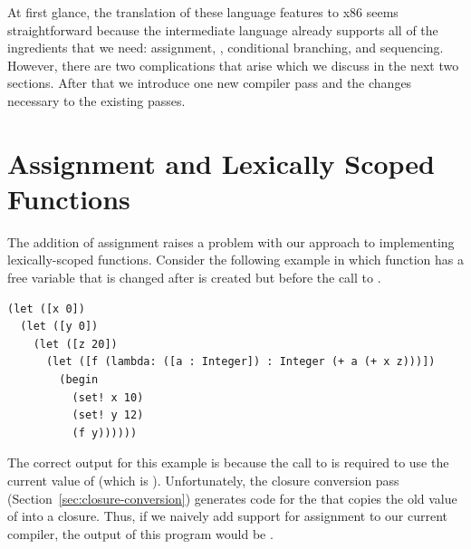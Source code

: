 \documentclass[11pt]{book}
\newcommand{\ocaml}[1]{{\color{blue}{#1}}}
\begin{document}
  
At first glance, the translation of these language features to x86
seems straightforward because the \LangCFun{} \ocaml{(OCaml: \LangCIf{})} intermediate language already
supports all of the ingredients that we need: assignment, ,
conditional branching, and sequencing. However, there are two 
complications that arise which we discuss in the next two
sections. \ocaml{Only one for us.} After that we introduce one new compiler pass and the
changes necessary to the existing passes.

\section{Assignment and Lexically Scoped Functions}
\label{sec:assignment-scoping}

\ocaml{This section is not relevant to the OCaml version, since we have no functions yet.}
The addition of assignment raises a problem with our approach to
implementing lexically-scoped functions. Consider the following
example in which function  has a free variable  that
is changed after  is created but before the call to .
\begin{lstlisting}
(let ([x 0])
  (let ([y 0])
    (let ([z 20])
      (let ([f (lambda: ([a : Integer]) : Integer (+ a (+ x z)))])
        (begin
          (set! x 10)
          (set! y 12)
          (f y))))))
\end{lstlisting}
The correct output for this example is  because the call to
 is required to use the current value of  (which is
). Unfortunately, the closure conversion pass
(Section~\ref{sec:closure-conversion}) generates code for the
 that copies the old value of  into a
closure. Thus, if we naively add support for assignment to our current
compiler, the output of this program would be .
\end{document}
